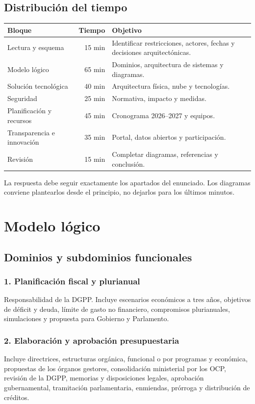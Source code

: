 \documentclass[11pt,a4paper]{article}
\begin{document}
\subsection{Distribución del tiempo}
\begin{center}
\begin{tabularx}{0.9\textwidth}{l r Y}
\toprule
\textbf{Bloque} & \textbf{Tiempo} & \textbf{Objetivo}\\
\midrule
Lectura y esquema & 15 min & Identificar restricciones, actores, fechas y decisiones arquitectónicas.\\
Modelo lógico & 65 min & Dominios, arquitectura de sistemas y diagramas.\\
Solución tecnológica & 40 min & Arquitectura física, nube y tecnologías.\\
Seguridad & 25 min & Normativa, impacto y medidas.\\
Planificación y recursos & 45 min & Cronograma 2026--2027 y equipos.\\
Transparencia e innovación & 35 min & Portal, datos abiertos y participación.\\
Revisión & 15 min & Completar diagramas, referencias y conclusión.\\
\bottomrule
\end{tabularx}
\end{center}

La respuesta debe seguir exactamente los apartados del enunciado. Los diagramas conviene plantearlos desde el principio, no dejarlos para los últimos minutos.

\section{Modelo lógico}

\subsection{Dominios y subdominios funcionales}

\subsubsection{1. Planificación fiscal y plurianual}
Responsabilidad de la DGPP. Incluye escenarios económicos a tres años, objetivos de déficit y deuda, límite de gasto no financiero, compromisos plurianuales, simulaciones y propuesta para Gobierno y Parlamento.

\subsubsection{2. Elaboración y aprobación presupuestaria}
Incluye directrices, estructuras orgánica, funcional o por programas y económica, propuestas de los órganos gestores, consolidación ministerial por los OCP, revisión de la DGPP, memorias y disposiciones legales, aprobación gubernamental, tramitación parlamentaria, enmiendas, prórroga y distribución de créditos.
\end{document}
